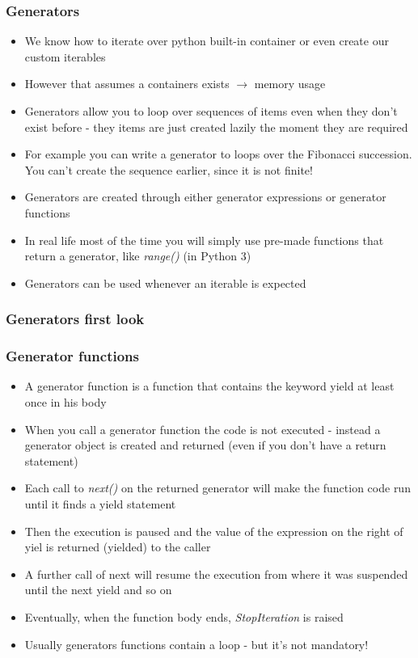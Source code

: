 \documentclass[9pt]{beamer}
\begin{document}
\begin{frame}
  \frametitle{Generators}
  
  \begin{itemize}
    \item We know how to iterate over python built-in container or even 
          create our custom iterables
    \item However that assumes a containers exists $\rightarrow$ memory usage
    \item \alert{Generators} allow you to loop over sequences of items even when
          they don't exist before - they items are just created \alert{lazily} the
          moment they are required
    \item For example you can write a generator to loops over the Fibonacci
          succession. You can't create the sequence earlier, since it is not
          finite!
    \item Generators are created through either \alert{generator expressions} or
          \alert{generator functions}
    \item In real life most of the time you will simply use pre-made functions
          that return a generator, like \emph{range()} (in Python 3)
    \item Generators can be used whenever an iterable is expected
  \end{itemize}
  
\end{frame}


\begin{frame}
  \frametitle{Generators first look}
  
\end{frame}


\begin{frame}
  \frametitle{Generator functions}
  
  \begin{itemize}
    \item A \alert{generator function} is a function that contains the keyword \alert{yield} at
          least once in his body
    \item When you call a generator function the code is not executed - instead
          a generator object is created and returned (even if you don't have a return statement)
    \item Each call to \emph{next()} on the returned generator will make the function code 
          run until it finds a yield statement
    \item Then the execution is paused and the value of the expression on the right 
          of yiel is returned (yielded) to the caller
    \item A further call of next will resume the execution from where it was suspended
          until the next yield and so on
    \item Eventually, when the function body ends, \emph{StopIteration} is raised
    \item Usually generators functions contain a loop - but it's not mandatory!
  \end{itemize}
  
\end{frame}
\end{document}
